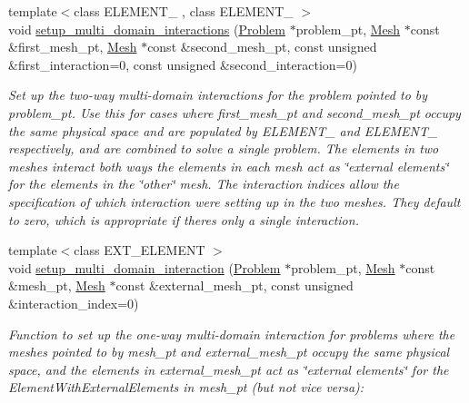\begin{DoxyCompactItemize}
{\footnotesize template$<$class E\+L\+E\+M\+E\+N\+T\+\_ , class E\+L\+E\+M\+E\+N\+T\+\_ $>$ }\\void \hyperlink{namespaceoomph_1_1Multi__domain__functions_a4a7ac2c45985582b30ed3ecb5d2623d2}{setup\+\_\+multi\+\_\+domain\+\_\+interactions} (\hyperlink{classoomph_1_1Problem}{Problem} $\ast$problem\+\_\+pt, \hyperlink{classoomph_1_1Mesh}{Mesh} $\ast$const \&first\+\_\+mesh\+\_\+pt, \hyperlink{classoomph_1_1Mesh}{Mesh} $\ast$const \&second\+\_\+mesh\+\_\+pt, const unsigned \&first\+\_\+interaction=0, const unsigned \&second\+\_\+interaction=0)
\begin{DoxyCompactList}\small\item\em Set up the two-\/way multi-\/domain interactions for the problem pointed to by {\ttfamily problem\+\_\+pt}. Use this for cases where first\+\_\+mesh\+\_\+pt and second\+\_\+mesh\+\_\+pt occupy the same physical space and are populated by E\+L\+E\+M\+E\+N\+T\+\_ and E\+L\+E\+M\+E\+N\+T\+\_ respectively, and are combined to solve a single problem. The elements in two meshes interact both ways the elements in each mesh act as \char`\"{}external elements\char`\"{} for the elements in the \char`\"{}other\char`\"{} mesh. The interaction indices allow the specification of which interaction we\textquotesingle{}re setting up in the two meshes. They default to zero, which is appropriate if there\textquotesingle{}s only a single interaction. \end{DoxyCompactList}\item 
{\footnotesize template$<$class E\+X\+T\+\_\+\+E\+L\+E\+M\+E\+NT $>$ }\\void \hyperlink{namespaceoomph_1_1Multi__domain__functions_ac64183e03f173c69ed6ed6f493a1a67e}{setup\+\_\+multi\+\_\+domain\+\_\+interaction} (\hyperlink{classoomph_1_1Problem}{Problem} $\ast$problem\+\_\+pt, \hyperlink{classoomph_1_1Mesh}{Mesh} $\ast$const \&mesh\+\_\+pt, \hyperlink{classoomph_1_1Mesh}{Mesh} $\ast$const \&external\+\_\+mesh\+\_\+pt, const unsigned \&interaction\+\_\+index=0)
\begin{DoxyCompactList}\small\item\em Function to set up the one-\/way multi-\/domain interaction for problems where the meshes pointed to by {\ttfamily mesh\+\_\+pt} and {\ttfamily external\+\_\+mesh\+\_\+pt} occupy the same physical space, and the elements in {\ttfamily external\+\_\+mesh\+\_\+pt} act as \char`\"{}external elements\char`\"{} for the {\ttfamily Element\+With\+External\+Elements} in {\ttfamily mesh\+\_\+pt} (but not vice versa)\+: \end{DoxyCompactList}\item 

\end{DoxyCompactItemize}
